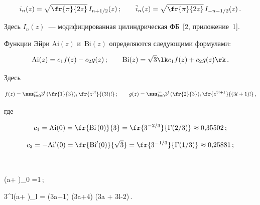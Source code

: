     \begin{equation*}

    i_n (z) = \sqrt{\fr{\pi}{2z}}\, I_{n+1/2} (z)\,;\qquad %

    \tilde i_n (z) = \sqrt{\fr{\pi}{2z}}\, I_{-n-1/2} (z)\,. %

    \end{equation*}

Здесь $I_n (z)$~--- модифицированная цилиндрическая ФБ~[2, приложение~1].



Функции Эйри  $\mathrm{Ai}(z)$  и~$\mathrm{Bi}(z)$ определяются следующими формулами:

    \begin{equation*}

    \Ai (z) = c_1 f(z) - c_2 g(z)\,;\qquad 

    \Bi(z) = \sqrt{3} \lk c_1 f(z) + c_2 g(z)\rk\,.


    \end{equation*}

Здесь

\begin{equation*}

f(z) = 

    \sss_{l=0}^\infty 3^l \left(\fr{1}{3}\right)_l \fr{z^{3l}}{(3l)!}\,;\qquad 

    g(z) = \sss_{l=0}^\infty 3^l \left(\fr{2}{3}\right)_l \fr{z^{3l+1}}{(3l+1)!}\,,


    \end{equation*}

где

    $$c_1 = \Ai (0) = \fr{\Bi\,(0)}{3} =\fr{3^{-2/3}}{\Gamma (2/3)} 

    \approx 0{,}35502\,;

    $$

    $$

    c_2 = -\Ai' (0) = \fr{\Bi'(0) }{\sqrt{3}} =

    \fr{3^{-1/3}}{\Gamma (1/3)} \approx 0{,}25881\,;

    $$

    $$

    \left(a+ \right)_0 =1\,;\quad 

    3^l\left(a+ \right)_l = (3a+1) (3a+4) \cdots (3a + 3l-2)\,.

